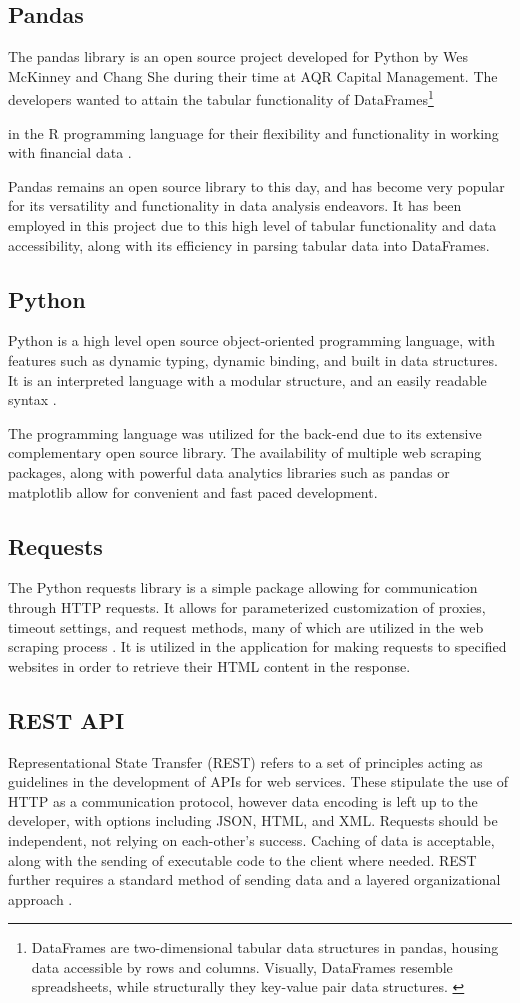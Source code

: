 \documentclass{thesis-ekf}
\theoremstyle{definition}
\theoremstyle{remark}
\begin{document}
{\subsection{Pandas}
The pandas library is an open source project developed for Python by Wes McKinney and Chang She during their time at  AQR Capital Management. The developers wanted to attain the tabular functionality of DataFrames\footnote{DataFrames are two-dimensional tabular data structures in pandas, housing data accessible by rows and columns. Visually, DataFrames resemble spreadsheets, while structurally they key-value pair data structures. \cite{wiki-pd}}} in the R programming language for their flexibility and functionality in working with financial data \cite{wiki-pd}.

Pandas remains an open source library to this day, and has become very popular for its versatility and functionality in data analysis endeavors. It has been employed in this project due to this high level of tabular functionality and data accessibility, along with its efficiency in parsing tabular data into DataFrames.

\subsection{Python} \label{sub-python}
Python is a high level open source object-oriented programming language, with features such as dynamic typing, dynamic binding, and built in data structures. It is an interpreted language with a modular structure, and an easily readable syntax \cite{python}.

The programming language was utilized for the back-end due to its extensive complementary open source library. The availability of multiple web scraping packages, along with powerful data analytics libraries such as pandas or matplotlib allow for convenient and fast paced development.

\subsection{Requests}
The Python requests library is a simple package allowing for communication through HTTP requests. It allows for parameterized customization of proxies, timeout settings, and request methods, many of which are utilized in the web scraping process \cite{req}. It is utilized in the application for making requests to specified websites in order to retrieve their HTML content in the response. 

\subsection{REST API}
Representational State Transfer (REST) refers to a set of principles acting as guidelines in the development of APIs for web services. These stipulate the use of HTTP as a communication protocol, however data encoding is left up to the developer, with options including JSON, HTML, and XML. Requests should be independent, not relying on each-other's success. Caching of data is acceptable, along with the sending of executable code to the client where needed. REST further requires a standard method of sending data and a layered organizational approach \cite{redhat-rest}.
\end{document}
